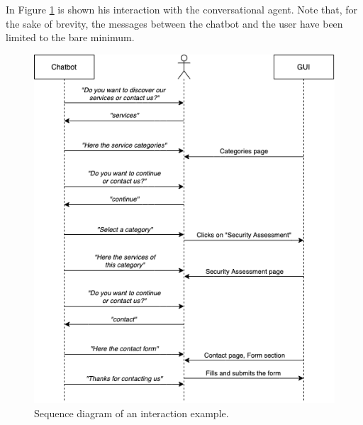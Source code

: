 \documentclass[12pt]{report}
\begin{document}
In Figure \ref{fig:sequence-diagram} is shown his interaction with the conversational agent.
Note that, for the sake of brevity, the messages between the chatbot and the user have been limited to the bare minimum.

\begin{figure}[h]
	\centering
	\includegraphics[width=\textwidth]{sequence-diagram}
	\caption{Sequence diagram of an interaction example.}
	\label{fig:sequence-diagram}
\end{figure}
\end{document}
